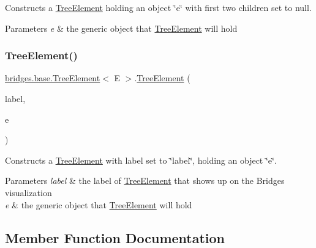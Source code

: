 Constructs a \hyperlink{classbridges_1_1base_1_1_tree_element}{Tree\+Element} holding an object \char`\"{}e\char`\"{} with first two children set to null.


\begin{DoxyParams}{Parameters}
{\em e} & the generic object that \hyperlink{classbridges_1_1base_1_1_tree_element}{Tree\+Element} will hold \\
\hline
\end{DoxyParams}
\mbox{\label{classbridges_1_1base_1_1_tree_element_a476cbeedf2c56f6a40a632035b7d740e}} 
\subsubsection{\texorpdfstring{Tree\+Element()}{TreeElement()}\hspace{0.1cm}{\footnotesize\ttfamily [3/3]}}
{\footnotesize\ttfamily \hyperlink{classbridges_1_1base_1_1_tree_element}{bridges.\+base.\+Tree\+Element}$<$ E $>$.\hyperlink{classbridges_1_1base_1_1_tree_element}{Tree\+Element} (\begin{DoxyParamCaption}\item[{String}]{label,  }\item[{E}]{e }\end{DoxyParamCaption})}

Constructs a \hyperlink{classbridges_1_1base_1_1_tree_element}{Tree\+Element} with label set to \char`\"{}label\char`\"{}, holding an object \char`\"{}e\char`\"{}. 
\begin{DoxyParams}{Parameters}
{\em label} & the label of \hyperlink{classbridges_1_1base_1_1_tree_element}{Tree\+Element} that shows up on the Bridges visualization \\
\hline
{\em e} & the generic object that \hyperlink{classbridges_1_1base_1_1_tree_element}{Tree\+Element} will hold \\
\hline
\end{DoxyParams}


\subsection{Member Function Documentation}
\mbox{\label{classbridges_1_1base_1_1_tree_element_a473c29486e99edc725423941b203e939}} 
